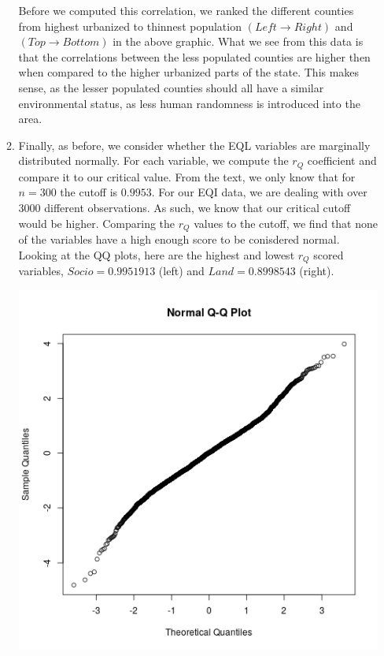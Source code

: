 \documentclass[letterpaper,10pt]{article}
\begin{document}
\begin{enumerate}
\begin{enumerate}
\begin{center}
\end{center}
Before we computed this correlation, we ranked the different counties from highest urbanized to thinnest population $(Left\to Right)$ and $(Top\to Bottom)$ in the above graphic. What we see from this data is that the correlations between the less populated counties are higher then when compared to the higher urbanized parts of the state. This makes sense, as the lesser populated counties should all have a similar environmental status, as less human randomness is introduced into the area.
\item Finally, as before, we consider whether the EQL variables are marginally distributed normally. For each variable, we compute the $r_Q$ coefficient and compare it to our critical value. From the text, we only know that for $n=300$ the cutoff is $0.9953$. For our EQI data, we are dealing with over $3000$ different observations. As such, we know that our critical cutoff would be higher. Comparing the $r_Q$ values to the cutoff, we find that none of the variables have a high enough score to be conisdered normal. Looking at the QQ plots, here are the highest and lowest $r_Q$ scored variables, $Socio=0.9951913$ (left) and $Land=0.8998543$ (right).
\begin{center}
\includegraphics[scale=.5]{highqq.png}

\end{center}
\end{enumerate}
\end{enumerate}
\end{document}
